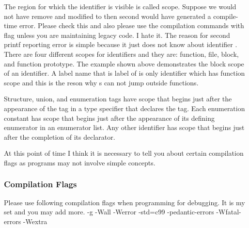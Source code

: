 The region for which the identifier is visible is called
scope. Suppose we would not have remove  and modified
 to  then second  would have
generated a compile-time error. Please check this and also please use
the compilation commands with  flag unless you are
maintaining legacy code. I hate it. The reason for second printf
reporting error is simple because it just does not know about identifier
. There are four different scopes for identifiers and they
are: function, file, block, and function prototype. The example shown
above demonstrates the block scope of an identifier. A label name that
is label of  is only identifier which has function scope
and this is the reson why s can not jump outside functions.

Structure, union, and enumeration tags have scope that begins just
after the appearance of the tag in a type specifier that declares the
tag. Each enumeration constant has scope that begins just after the
appearance of its defining enumerator in an enumerator list. Any other
identifier has scope that begins just after the completion of its
declarator.

At this point of time I think it is necessary to tell you about
certain compilation flags as programs may not involve simple concepts.
\subsubsection{Compilation Flags}
Please use following compilation flags when programming for
debugging. It is my set and you may add more.
\starttyping
-g -Wall -Werror  -std=c99 -pedantic-errors  -Wfatal-errors -Wextra
\stoptyping

